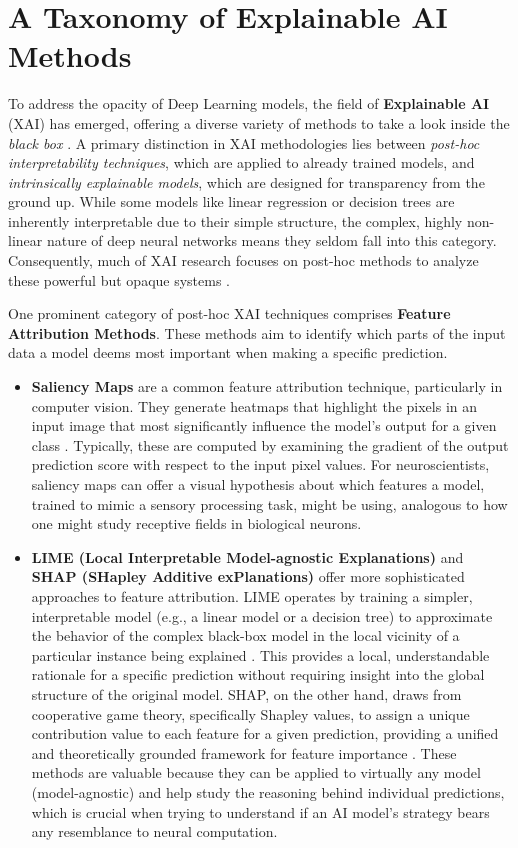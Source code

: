 \section{A Taxonomy of Explainable AI Methods}\label{sec:XAI-tax}

To address the opacity of Deep Learning models, the field of \textbf{Explainable AI} (XAI) has emerged, offering a diverse variety of methods to take a look inside the \textit{black box} \cite{doshi2017towards, miller2019explanation}. A primary distinction in XAI methodologies lies between \textit{post-hoc interpretability techniques}, which are applied to already trained models, and \textit{intrinsically explainable models}, which are designed for transparency from the ground up. While some models like linear regression or decision trees are inherently interpretable due to their simple structure, the complex, highly non-linear nature of deep neural networks means they seldom fall into this category. Consequently, much of XAI research focuses on post-hoc methods to analyze these powerful but opaque systems \cite{doshi2017towards}.

One prominent category of post-hoc XAI techniques comprises \textbf{Feature Attribution Methods}. These methods aim to identify which parts of the input data a model deems most important when making a specific prediction.
\begin{itemize}
    \item \textbf{Saliency Maps} are a common feature attribution technique, particularly in computer vision. They generate heatmaps that highlight the pixels in an input image that most significantly influence the model's output for a given class \cite{fong2017interpretable}. Typically, these are computed by examining the gradient of the output prediction score with respect to the input pixel values. For neuroscientists, saliency maps can offer a visual hypothesis about which features a model, trained to mimic a sensory processing task, might be using, analogous to how one might study receptive fields in biological neurons.
    \item \textbf{LIME (Local Interpretable Model-agnostic Explanations)} and \textbf{SHAP (SHapley Additive exPlanations)} offer more sophisticated approaches to feature attribution. LIME operates by training a simpler, interpretable model (e.g., a linear model or a decision tree) to approximate the behavior of the complex black-box model in the local vicinity of a particular instance being explained \cite{ribeiro2016why}. This provides a local, understandable rationale for a specific prediction without requiring insight into the global structure of the original model. SHAP, on the other hand, draws from cooperative game theory, specifically Shapley values, to assign a unique contribution value to each feature for a given prediction, providing a unified and theoretically grounded framework for feature importance \cite{lundberg2017unified}. These methods are valuable because they can be applied to virtually any model (model-agnostic) and help study the reasoning behind individual predictions, which is crucial when trying to understand if an AI model's strategy bears any resemblance to neural computation.
\end{itemize}

